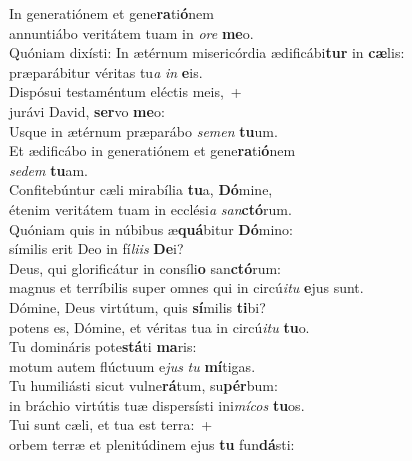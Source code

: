 \evenverse In generatiónem et gene\textbf{ra}ti\textbf{ó}nem~\*\\
\evenverse annuntiábo veritátem tuam in \textit{o}\textit{re} \textbf{me}o.\\
\oddverse Quóniam dixísti: In ætérnum misericórdia ædificábi\textbf{tur} in \textbf{cæ}lis:~\*\\
\oddverse præparábitur véritas tu\textit{a} \textit{in} \textbf{e}is.\\
\evenverse Dispósui testaméntum eléctis meis,~+\\
\evenverse  jurávi David, \textbf{ser}vo \textbf{me}o:~\*\\
\evenverse Usque in ætérnum præparábo \textit{se}\textit{men} \textbf{tu}um.\\
\oddverse Et ædificábo in generatiónem et gene\textbf{ra}ti\textbf{ó}nem~\*\\
\oddverse \textit{se}\textit{dem} \textbf{tu}am.\\
\evenverse Confitebúntur cæli mirabília \textbf{tu}a, \textbf{Dó}mine,~\*\\
\evenverse étenim veritátem tuam in ecclési\textit{a} \textit{san}\textbf{ctó}rum.\\
\oddverse Quóniam quis in núbibus æ\textbf{quá}bitur \textbf{Dó}mino:~\*\\
\oddverse símilis erit Deo in fí\textit{li}\textit{is} \textbf{De}i?\\
\evenverse Deus, qui glorificátur in consíli\textbf{o} san\textbf{ctó}rum:~\*\\
\evenverse magnus et terríbilis super omnes qui in circú\textit{i}\textit{tu} \textbf{e}jus sunt.\\
\oddverse Dómine, Deus virtútum, quis \textbf{sí}milis \textbf{ti}bi?~\*\\
\oddverse potens es, Dómine, et véritas tua in circú\textit{i}\textit{tu} \textbf{tu}o.\\
\evenverse Tu domináris pote\textbf{stá}ti \textbf{ma}ris:~\*\\
\evenverse motum autem flúctuum e\textit{jus} \textit{tu} \textbf{mí}tigas.\\
\oddverse Tu humiliásti sicut vulne\textbf{rá}tum, su\textbf{pér}bum:~\*\\
\oddverse in bráchio virtútis tuæ dispersísti ini\textit{mí}\textit{cos} \textbf{tu}os.\\
\evenverse Tui sunt cæli, et tua est terra:~+\\
\evenverse  orbem terræ et plenitúdinem ejus \textbf{tu} fun\textbf{dá}sti:~\*\\
